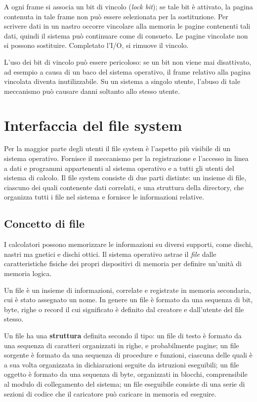 \documentclass[11pt,a4paper]{article}
\begin{document}
{A ogni frame si associa un bit di vincolo (\emph{lock bit}); se tale bit è attivato, la pagina contenuta
in tale frame non può essere selezionata per la sostituzione. Per
scrivere dati in un nastro occorre vincolare alla memoria le pagine contenenti tali dati, quin­di il sistema può continuare come di consueto. Le pagine vincolate non si possono sostitui­re. Completato l'I/O, si rimuove il vincolo.

L'uso dei bit di vincolo può essere pericoloso: se un bit non viene mai disatti­vato, ad esempio a causa di un baco del sistema operativo, il frame relativo alla pagina vin­colata diventa inutilizzabile. Su un sistema a singolo utente, l'abuso di tale meccanismo può
causare danni soltanto allo stesso utente.

\section{Interfaccia del file system}
Per la maggior parte degli utenti il file system è l'aspetto più visibile di un sistema operativo.
Fornisce il meccanismo per la registrazione e l'accesso in linea a dati e programmi ap­partenenti al sistema operativo e a tutti gli utenti del sistema di calcolo. Il file system consi­ste di due parti distinte: un insieme di file, ciascuno dei quali contenente dati correlati, e
una struttura della directory, che organizza tutti i file nel sistema e fornisce le informazioni
relative.

\subsection{Concetto di file}
I calcolatori possono memorizzare le informazioni su diversi supporti, come dischi, nastri ma­
gnetici e dischi ottici. Il sistema operativo astrae il \emph{file} dalle caratteristiche
fisiche dei propri dispositivi di memoria per definire un'unità di memoria logica.

Un file è un insieme di informazioni, correlate e registrate in memoria secondaria, cui
è stato assegnato un nome. In genere un file è formato da una sequenza di bit, byte, righe o record il cui significato è definito dal creatore e dall'utente del file stesso.

Un file ha una \textbf{struttura} definita secondo il tipo: un
file di testo è formato da una sequenza di caratteri organizzati in righe, e probabilmente pa­gine; un file sorgente è formato da una sequenza di procedure e funzioni, ciascuna delle qua­li è a sua volta organizzata in dichiarazioni seguite da istruzioni eseguibili; un file oggetto è
formato da una sequenza di byte, organizzati in blocchi, comprensibile al modulo di collegamento del sistema; un file eseguibile consiste di una serie di sezioni di codice che il carica­tore può caricare in memoria ed eseguire.

}
\end{document}

